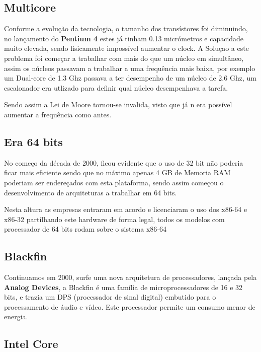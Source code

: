\documentclass{report}
\begin{document}
\subsection{Multicore}
\label{sect.Multicore}

Conforme a evolução da tecnologia, o tamanho dos transístores foi diminuindo, no lançamento do \textbf{Pentium 4} estes já tinham 0.13 micrómetros e capacidade muito elevada, sendo fisicamente impossível aumentar o clock. A Soluçao a este problema foi começar a trabalhar com mais do que um núcleo em simultâneo, assim os núcleos passavam a trabalhar a uma frequência mais baixa, por exemplo um Dual-core de 1.3 Ghz passava a ter desempenho de um núcleo de 2.6 Ghz, um escalonador era utlizado para definir qual núcleo desempenhava a tarefa. 

Sendo assim a Lei de Moore tornou-se invalida, visto que já n era possível aumentar a frequência como antes.

\subsection{Era 64 bits}
\label{sect.Era 64 bits}

No começo da década de 2000, ficou evidente que o uso de 32 bit não poderia ficar mais eficiente sendo que no máximo apenas 4 GB de Memoria RAM poderiam ser endereçados com esta plataforma, sendo assim começou o desenvolvimento de arquiteturas a trabalhar em 64 bits.

Nesta altura as empresas entraram em acordo e licenciaram o uso dos x86-64 e x86-32 partilhando este hardware de forma legal, todos os modelos com processador de 64 bits rodam sobre o sistema x86-64

\subsection{Blackfin}
\label{sect.Blackfin}

Continuamos em 2000, surfe uma nova arquitetura de processadores, lançada pela \textbf{Analog Devices}, a Blackfin é uma família de microprocessadores de 16 e 32 bits, e trazia um DPS (processador de sinal digital) embutido para o processamento de áudio e vídeo.
Este processador permite um consumo menor de energia.

\subsection{Intel Core}
\label{sect.Intel Core}
\end{document}
